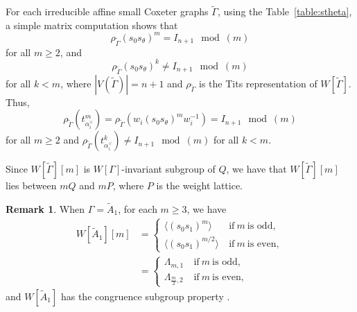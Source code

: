 \documentclass[12pt]{amsart}
\theoremstyle{definition}
\newtheorem{remark}[equation]{Remark}
\numberwithin{equation}{section}
\begin{document}
For each irreducible affine small Coxeter graphs $\tilde{\Gamma}$, using the Table~\ref{table:stheta}, a simple matrix computation shows that $$\rho_{\tilde{\Gamma}}(s_0s_\theta)^m = I_{n+1} \mod (m)$$ for all $m\geq 2$, and 
$$\rho_{\tilde{\Gamma}}(s_0s_\theta)^k \neq I_{n+1} \mod (m)$$ for all $k<m$,
 where $|V(\tilde{\Gamma})|=n+1$ and $\rho_{\tilde{\Gamma}}$ is the Tits representation of $W[\tilde{\Gamma}]$. Thus, 
$$
\rho_{\tilde{\Gamma}}(t^m_{\alpha_i^{\vee}})=\rho_{\tilde{\Gamma}}(w_i(s_0s_\theta)^mw_i^{-1}) = I_{n+1} \mod (m)
$$
 for all $m\geq 2$ and $\rho_{\tilde{\Gamma}}(t^k_{\alpha_i^{\vee}}) \neq I_{n+1} \mod (m)$ for all $k<m$.


 Since $W[\tilde{\Gamma}][m]$ is $W[\Gamma]$-invariant subgroup of $Q$, we have that $ W[\tilde{\Gamma}][m]$  lies between $m Q$ and $m P$, where $P$ is the weight lattice.

  
  \begin{remark}
  When $\Gamma=\tilde{A}_1$, for each \(m \geq 3\), we have 
\begin{equation}\label{csA1}
\begin{aligned}
W[\tilde{A}_1][m]  &=\left\{\begin{array}{ll}
 \langle (s_0s_1)^m \rangle & ~\text {if} ~m~\textrm{is odd},\\
\langle (s_0s_1)^{m/2}\rangle  & ~\text {if} ~m~\textrm{is even},
\end{array}\right.\\
&=\left\{\begin{array}{ll}
\Lambda_{m,1}  & ~\text {if} ~m~\textrm{is odd},\\
\Lambda_{\frac{m}{2},2}  & ~\text {if} ~m~\textrm{is even},
\end{array}\right.
\end{aligned}
\end{equation}
and $W[\tilde{A}_1]$ has the congruence subgroup property \cite[Proposition 3.20 and Corollary 3.21]{mypaper1}. 
\end{remark}
  
\end{document}
